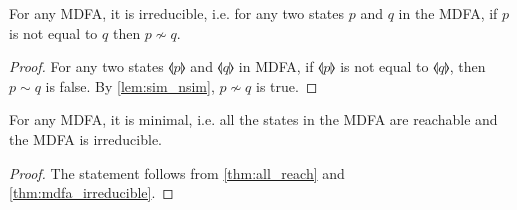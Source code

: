 \begin{thm}
\label{thm:mdfa_irreducible}
\noindent For any MDFA, it is irreducible, i.e. for any two states
\(p\) and \(q\) in the MDFA, if \(p\) is not equal to \(q\) then \(p \nsim q\). 
\end{thm}

\begin{proof}
\noindent For any two states \(\llangle p \rrangle\) and \(\llangle q
\rrangle\) in MDFA, if \(\llangle p \rrangle\) is not equal to \(\llangle q
\rrangle\), then \(p \sim q\) is false. By \autoref{lem:sim_nsim},
\(p \nsim q\) is true. 
\end{proof}

\begin{thm}
\noindent For any MDFA, it is minimal, i.e. all the states in the MDFA
are reachable and the MDFA is irreducible. 
\end{thm}

\begin{proof}
\noindent The statement follows from \autoref{thm:all_reach}
and \autoref{thm:mdfa_irreducible}. 
\end{proof}


